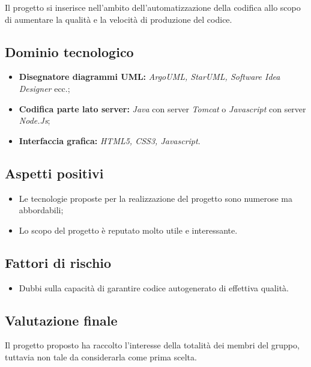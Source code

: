 \documentclass[openany,12pt,a4paper]{report}
\begin{document}
	Il progetto si inserisce nell'ambito dell'automatizzazione della codifica allo scopo di aumentare la qualità e la velocità di produzione del codice.

	\subsection{Dominio tecnologico}

	\begin{itemize}
		\item \textbf{Disegnatore diagrammi UML:} \textit{ArgoUML, StarUML, Software Idea Designer} ecc.;

		\item \textbf{Codifica parte lato server:} \textit{Java} con server \textit{Tomcat} o \textit{Javascript} con server \textit{Node.Js};

		\item \textbf{Interfaccia grafica:} \textit{HTML5, CSS3, Javascript}.
	\end{itemize}

	\subsection{Aspetti positivi}

	\begin{itemize}
		\item Le tecnologie proposte per la realizzazione del progetto sono numerose ma abbordabili;

		\item Lo scopo del progetto è reputato molto utile e interessante.
	\end{itemize}

	\subsection{Fattori di rischio}

	\begin{itemize}
		\item Dubbi sulla capacità di garantire codice autogenerato di effettiva qualità.
	\end{itemize}

	\subsection{Valutazione finale}

	Il progetto proposto ha raccolto l'interesse della totalità dei membri del gruppo, tuttavia non tale da considerarla come prima scelta.
\end{document}

